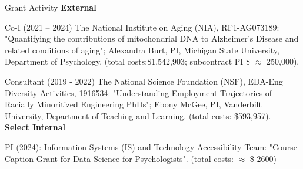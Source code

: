 \begin{rSection}{\textrm{Grant Activity}}%
{\large \textbf{External}}%
\begin{etaremune}
\item Co-I (2021 – 2024) The National Institute on Aging (NIA), RF1-AG073189: "Quantifying the contributions of mitochondrial DNA to Alzheimer's Disease and related conditions of aging"; Alexandra Burt, PI, Michigan State University, Department of Psychology. (total costs:\$1,542,903; subcontract PI \$ $\approx$ 250,000).

\item Consultant (2019 - 2022) The National Science Foundation (NSF), EDA-Eng Diversity Activities, 1916534: "Understanding Employment Trajectories of Racially Minoritized Engineering PhDs"; Ebony McGee, PI, Vanderbilt University, Department of Teaching and Learning. (total costs: \$593,957).
\smallskip\\
\hspace*{-8mm}\large{\bf{Select Internal}}%

\item PI (2024):  Information Systems (IS) and Technology Accessibility Team: "Course Caption Grant for Data Science for Psychologists". (total costs: $\approx$ \$ 2600)%
\end{etaremune}
\end{rSection}